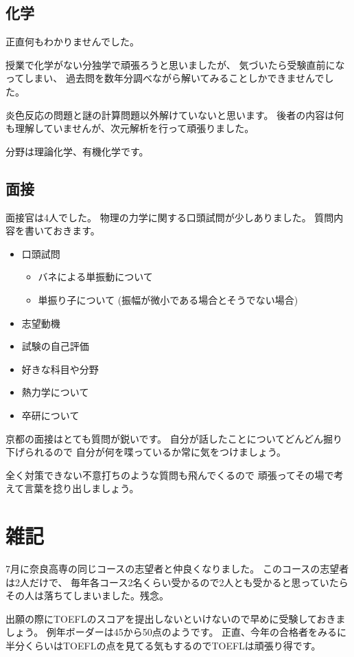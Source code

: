 \documentclass[]{jsarticle}
\begin{document}
    \subsection*{化学}
        正直何もわかりませんでした。

        授業で化学がない分独学で頑張ろうと思いましたが、
        気づいたら受験直前になってしまい、
        過去問を数年分調べながら解いてみることしかできませんでした。
        
        炎色反応の問題と謎の計算問題以外解けていないと思います。
        後者の内容は何も理解していませんが、次元解析を行って頑張りました。

        分野は理論化学、有機化学です。
    \subsection*{面接}
        面接官は4人でした。
        物理の力学に関する口頭試問が少しありました。
        質問内容を書いておきます。
        \begin{itemize}
            \item 口頭試問
            \begin{itemize}
                \item バネによる単振動について
                \item 単振り子について (振幅が微小である場合とそうでない場合)
            \end{itemize}
            \item 志望動機
            \item 試験の自己評価
            \item 好きな科目や分野
            \item 熱力学について
            \item 卒研について
        \end{itemize}

        京都の面接はとても質問が鋭いです。
        自分が話したことについてどんどん掘り下げられるので
        自分が何を喋っているか常に気をつけましょう。

        全く対策できない不意打ちのような質問も飛んでくるので
        頑張ってその場で考えて言葉を捻り出しましょう。
\section*{雑記}
    7月に奈良高専の同じコースの志望者と仲良くなりました。
    このコースの志望者は2人だけで、
    毎年各コース2名くらい受かるので2人とも受かると思っていたら
    その人は落ちてしまいました。残念。

    出願の際にTOEFLのスコアを提出しないといけないので早めに受験しておきましょう。
    例年ボーダーは45から50点のようです。
    正直、今年の合格者をみるに半分くらいはTOEFLの点を見てる気もするのでTOEFLは頑張り得です。
\end{document}
